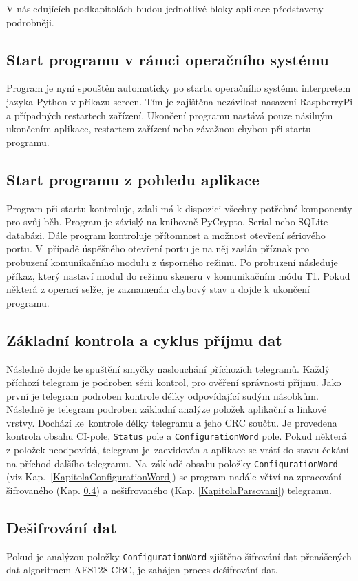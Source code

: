 V následujících podkapitolách budou jednotlivé bloky aplikace představeny podrobněji.

\subsection{Start programu v rámci operačního systému}
Program je nyní spouštěn automaticky po startu operačního systému interpretem jazyka Python v příkazu screen. Tím je zajištěna nezávilost nasazení RaspberryPi a případných restartech zařízení. Ukončení programu nastává pouze násilným ukončením aplikace, restartem zařízení nebo závažnou chybou při startu programu. 

\subsection{Start programu z pohledu aplikace}
Program při startu kontroluje, zdali  má k dispozici všechny potřebné komponenty pro svůj běh. Program je závislý na knihovně PyCrypto, Serial nebo SQLite databázi.
Dále program kontroluje přítomnost a možnost otevření sériového portu. V~případě úspěšného otevření portu je na něj zaslán příznak pro probuzení komunikačního modulu z úsporného režimu. Po probuzení následuje příkaz, který nastaví modul do režimu skeneru v komunikačním módu T1. Pokud některá z operací selže, je zaznamenán chybový stav a dojde k ukončení programu.

\subsection{Základní kontrola a cyklus příjmu dat}
Následně dojde ke spuštění smyčky naslouchání příchozích telegramů. Každý příchozí telegram je podroben sérii kontrol, pro ověření správnosti příjmu. Jako první je telegram podroben kontrole délky odpovídající sudým násobkům. Následně je telegram podroben základní analýze položek aplikační a linkové vrstvy. Dochází ke~kontrole délky telegramu a jeho CRC součtu. Je provedena kontrola obsahu CI-pole, \texttt{Status} pole a \texttt{ConfigurationWord} pole. Pokud některá z položek neodpovídá, telegram je~zaevidován a aplikace se vrátí do stavu čekání na příchod dalšího telegramu.
Na~základě obsahu položky \texttt{ConfigurationWord} (viz Kap.~\ref{KapitolaConfigurationWord}) se program nadále větví na zpracování šifrovaného (Kap. \ref{KapitolaDesifrovani}) a nešifrovaného (Kap. \ref{KapitolaParsovani}) telegramu.

\subsection{Dešifrování dat}
\label{KapitolaDesifrovani}
Pokud je analýzou položky \texttt{ConfigurationWord} zjištěno šifrování dat přenášených dat algoritmem AES128 CBC, je zahájen proces dešifrování dat.

